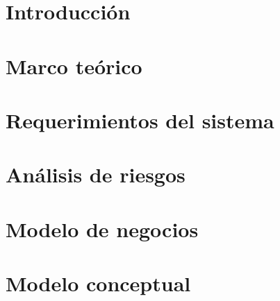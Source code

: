 \documentclass[10pt]{book}
\begin{document}
\thispagestyle{empty}


\frontmatter
{}
\tableofcontents
\listoffigures
\mainmatter

\hideControlVersion

\chapter{Introducción}\label{chp:introduccion}

\chapter{Marco teórico}\label{chp:marcoTeorico} 
\hypertarget{chp:marcoTeorico}{}
\chapter{Requerimientos del sistema}\label{chp:requerimientos}
\hypertarget{chp:requerimientos}{}
\chapter{Análisis de riesgos}\label{chp:riesgos}

\chapter{Modelo de negocios}\label{chp:modeloNegocios}

 \chapter{Modelo conceptual}\label{chp:modeloConceptual}
\end{document}

